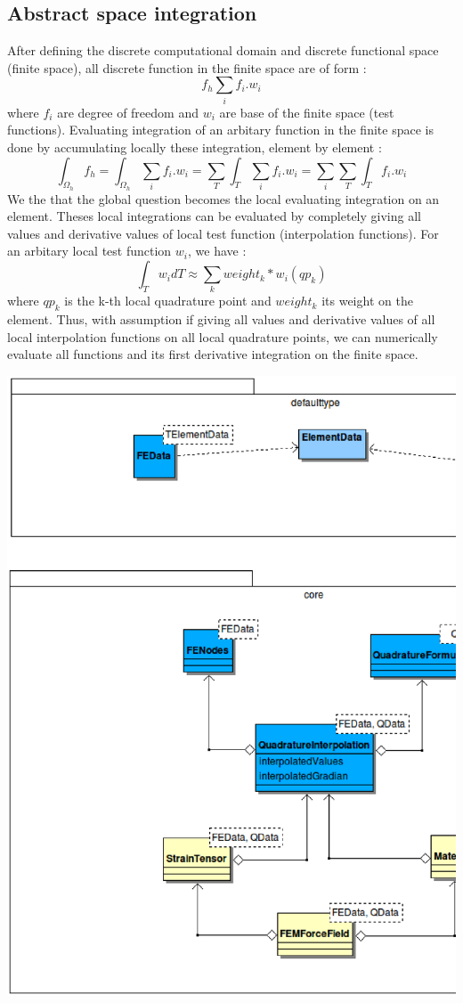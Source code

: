 \documentclass[a4paper,10pt]{article}
\begin{document}
\subsection{Abstract space integration }
After defining the discrete computational domain and discrete functional space (finite space), all discrete function in the finite space are of form :
\[
 f_h \sum_{i} f_i.w_i
\]
where $f_i$ are degree of freedom and $w_i$ are base of the finite space (test functions). Evaluating integration of an arbitary function in the finite space is done by accumulating locally these integration, element by element : 
\[
 \int_{\Omega_h} f_h = \int_{\Omega_h} \sum_{i} f_i.w_i  =   \sum_{T} \int_{T} \sum_{i} f_i.w_i = \sum_{i} \sum_{T} \int_{T} f_i.w_i
\]
We the that the global question becomes the local evaluating integration on an element. Theses local integrations can be evaluated by completely giving all values and derivative values of local test function (interpolation functions). For an arbitary local test function $w_i$, we have :  
\[
 \int_{T} w_i dT \approx \sum_{k} weight_{k} * w_i(qp_{k}) 
\]  
where $qp_{k}$ is the k-th local quadrature point and $weight_{k}$ its weight on the element. Thus, with assumption if giving all values and derivative values of all local interpolation functions on all local quadrature points, we can numerically evaluate all functions and its first derivative integration on the finite space. 
\begin{center}
 \includegraphics[scale=0.5]{FEMCore}
\end{center}
\end{document}
